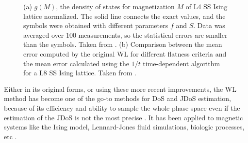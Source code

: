 \begin{figure}[ht]
\centering
{}
\quad
{}

\caption{(a) $g(M)$, the density of states for magnetization $M$ of L4 SS Ising lattice normalized. The solid line connects the exact values, and the symbols were obtained with different parameters $f$ and $S$. Data was averaged over $100$ measurements, so the statistical errors are smaller than the symbols. Taken from \cite{Zhou2005}.  (b) Comparison between the mean error computed by the original WL for different flatness criteria and the mean error calculated using the $1/t$ time-dependent algorithm for a L8 SS Ising lattice. Taken from \cite{Belardinelli2007}.}

\end{figure}





Either in its original forms, or using these more recent improvements, the WL method has become one of the go-to methods for DoS and JDoS estimation, because of its efficiency and ability to sample the whole phase space even if the estimation of the JDoS is not the most precise \cite{Zhou2005, Belardinelli2007}. It has been applied to magnetic systems like the Ising model, Lennard-Jones fluid simulations, biologic processes, etc \cite{Maerzke2014, Yan2002,Yan2003}.












